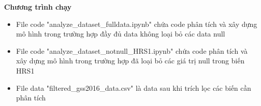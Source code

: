 \textbf{Chương trình chạy}
\begin{itemize}
    \item File code "analyze\_dataset\_fulldata.ipynb" chứa code phân tích và xây dựng mô hình trong trường hợp đầy đủ data không loại bỏ các data null 
    \item File code "analyze\_dataset\_notnull\_HRS1.ipynb" chứa code phân tích và xây dựng mô hình trong trường hợp đã loại bỏ các giá trị null trong biến HRS1
    \item File data "filtered\_gss2016\_data.csv" là data sau khi trích lọc các biến cần phân tích
\end{itemize}